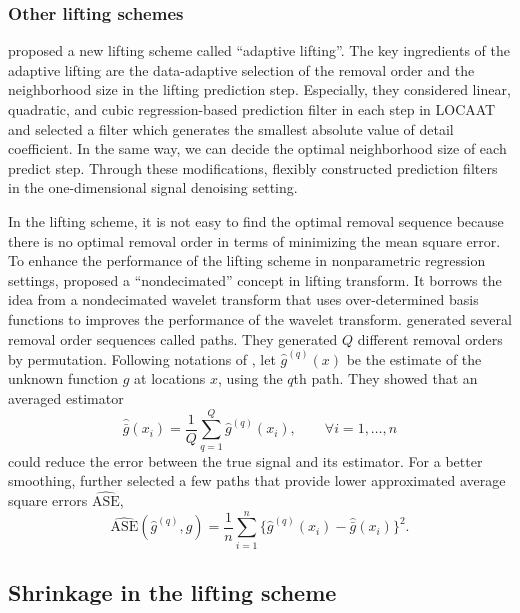 \documentclass[11pt,titlepage]{article}
\begin{document}
\subsubsection{Other lifting schemes}\label{subsec:otherlifting}
\cite{Nunes2006} proposed a new lifting scheme called ``adaptive lifting''. The key ingredients of the adaptive lifting are the data-adaptive selection of the removal order and the neighborhood size in the lifting prediction step. Especially, they considered linear, quadratic, and cubic regression-based prediction filter in each step in LOCAAT and selected a filter which generates the smallest absolute value of detail coefficient. In the same way, we can decide the optimal neighborhood size of each predict step. Through these modifications, \cite{Nunes2006} flexibly constructed prediction filters in the one-dimensional signal denoising setting.

In the lifting scheme, it is not easy to find the optimal removal sequence because there is no optimal removal order in terms of minimizing the mean square error. To enhance the performance of the lifting scheme in nonparametric regression settings, \cite{Knight2009} proposed a ``nondecimated'' concept in lifting transform. It borrows the idea from a nondecimated wavelet transform that uses over-determined basis functions to improves the performance of the wavelet transform. \cite{Knight2009} generated several removal order sequences called paths. They generated $Q$ different removal orders by permutation. Following notations of \cite{Knight2009}, let $\hat{g}^{(q)}(x)$ be the estimate of the unknown function $g$ at locations $x$, using the $q$th path. They showed that an averaged estimator $$\hat{\bar{g}}(x_{i}) = \frac{1}{Q}\sum_{q=1}^{Q}\hat{g}^{(q)}(x_{i}), \qquad{\forall i = 1,\ldots , n}
$$
could reduce the error between the true signal and its estimator. For a better smoothing, \cite{Knight2009} further selected a few paths that provide lower approximated average square errors $\widehat{\text{ASE}}$,
\[
\widehat{\text{ASE}}(\hat{g}^{(q)},g) =\frac{1}{n}\sum_{i=1}^{n}\{ \hat{g}^{(q)}(x_i) -\hat{\bar{g}}(x_i) \}^{2}.
\]

\subsection{Shrinkage in the lifting scheme}
\end{document}
